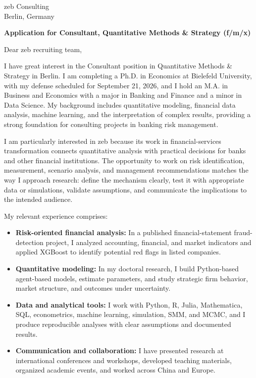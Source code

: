 \documentclass[11pt]{article}
\begin{document}
\vspace{0.1cm}

\vspace{0.1cm}

\noindent
zeb Consulting \\
Berlin, Germany

\vspace{0.12cm}

\noindent
\textbf{Application for Consultant, Quantitative Methods \& Strategy (f/m/x)}

\vspace{0.1cm}

\noindent Dear zeb recruiting team,

I have great interest in the Consultant position in Quantitative Methods \& Strategy in Berlin. 
I am completing a Ph.D. in Economics at Bielefeld University, with my defense scheduled for September 21, 2026, 
and I hold an M.A. in Business and Economics with a major in Banking and Finance and a minor in Data Science. 
My background includes quantitative modeling, financial data analysis, machine learning, 
and the interpretation of complex results, 
providing a strong foundation for consulting projects in banking risk management.

I am particularly interested in zeb because its work in financial-services transformation connects quantitative analysis with practical decisions for banks and other financial institutions. 
The opportunity to work on risk identification, measurement, scenario analysis, 
and management recommendations matches the way I approach research: 
define the mechanism clearly, test it with appropriate data or simulations, 
validate assumptions, and communicate the implications to the intended audience.

My relevant experience comprises:

\begin{itemize}
    \item \textbf{Risk-oriented financial analysis:} In a published financial-statement fraud-detection project, I analyzed accounting, financial, and market indicators and applied XGBoost to identify potential red flags in listed companies.
    \item \textbf{Quantitative modeling:} In my doctoral research, I build Python-based agent-based models, estimate parameters, and study strategic firm behavior, market structure, and outcomes under uncertainty.
    \item \textbf{Data and analytical tools:} I work with Python, R, Julia, Mathematica, SQL, econometrics, machine learning, simulation, SMM, and MCMC, and I produce reproducible analyses with clear assumptions and documented results.
    \item \textbf{Communication and collaboration:} I have presented research at international conferences and workshops, developed teaching materials, organized academic events, and worked across China and Europe.
\end{itemize}
\end{document}

